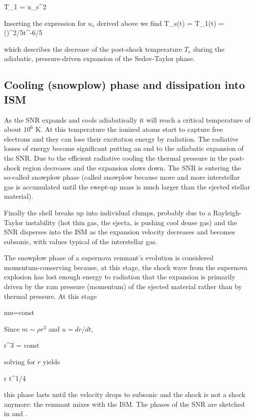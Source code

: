 \beq
T_1 =  u_s^2
\eeq

Inserting the expression for $u_s$ derived above we find
\beq
T_s(t) = T_1(t) = \left(\right)^{2/5}t^{-6/5}
\eeq

\noindent which describes the decrease of the post-shock temperature $T_s$ during the adiabatic,
pressure-driven expansion of the Sedov-Taylor phase.

\subsection{Cooling (snowplow) phase and dissipation into ISM}

As the SNR expands and cools adiabatically it will reach a critical temperature of about
$10^6$ K. At this temperature the ionized atoms start to capture free electrons and they can
lose their excitation energy by radiation. The radiative losses of energy become significant
putting an end to the adiabatic expansion of the SNR. Due to the eﬃcient radiative cooling
the thermal pressure in the post-shock region decreases and the expansion slows down.
The SNR is entering the so-called snowplow phase (called snowplow because more and more interstellar gas
is accumulated until the swept-up mass is much larger than the ejected stellar material).

Finally the shell breaks up into individual clumps, probably due to a Rayleigh-Taylor
instability (hot thin gas, the ejecta, is pushing cool dense gas) and the SNR disperses into the ISM
as the expansion velocity decreases and becomes subsonic, with values typical of the interstellar gas.

The snowplow phase of a supernova remnant’s evolution is considered
momentum-conserving because, at this stage, the shock wave from the
supernova explosion has lost enough energy to radiation that the
expansion is primarily driven by the ram pressure (momentum) of the
ejected material rather than by thermal pressure. At this stage

\beq
mu={\rm const}
\eeq

Since $m \sim \rho r^3$ and $u=dr/dt$,

\beq
\rho r^3  = {\rm const}
\eeq

solving for $r$ yields

\beq
r \propto t^{1/4}
\eeq

this phase lasts until the velocity drops to subsonic and the shock is
not a shock anymore: the renmant mixes with the ISM. The phases of the
SNR are sketched in   and . 


